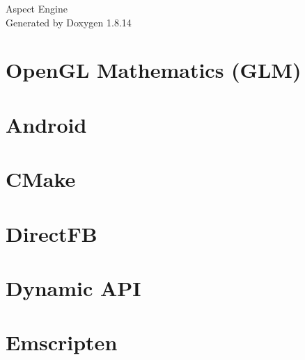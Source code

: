 \documentclass[twoside]{book}
\newcommand{\+}{\discretionary{\mbox{\scriptsize$\hookleftarrow$}}{}{}}
\newcommand{\clearemptydoublepage}{%
  \newpage{\pagestyle{empty}\cleardoublepage}%
}
\begin{document}
\hypersetup{pageanchor=false,
             bookmarksnumbered=true,
             pdfencoding=unicode
            }
\begin{titlepage}
\vspace*{7cm}
\begin{center}%
{\Large Aspect Engine }\\
\vspace*{1cm}
{\large Generated by Doxygen 1.8.14}\\
\end{center}
\end{titlepage}
\clearemptydoublepage
{}
\tableofcontents
\clearemptydoublepage
{}
\hypersetup{pageanchor=true}

\chapter{Open\+GL Mathematics (G\+LM)}
\label{index}\hypertarget{index}{}
\chapter{Android}
\label{md__contrib__s_d_l2-2_80_88_docs__r_e_a_d_m_e-android}

\chapter{C\+Make}
\label{md__contrib__s_d_l2-2_80_88_docs__r_e_a_d_m_e-cmake}

\chapter{Direct\+FB}
\label{md__contrib__s_d_l2-2_80_88_docs__r_e_a_d_m_e-directfb}

\chapter{Dynamic A\+PI}
\label{md__contrib__s_d_l2-2_80_88_docs__r_e_a_d_m_e-dynapi}

\chapter{Emscripten}
\label{md__contrib__s_d_l2-2_80_88_docs__r_e_a_d_m_e-emscripten}

\end{document}
